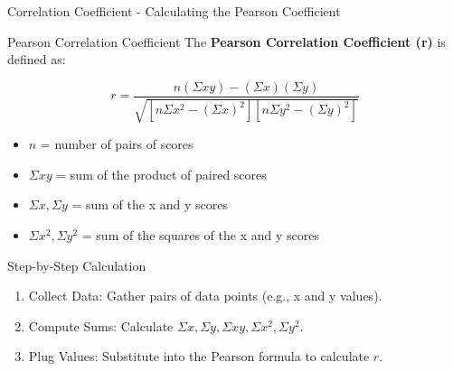 \documentclass[aspectratio=169]{beamer}
\begin{document}
\begin{frame}[fragile]{Correlation Coefficient - Calculating the Pearson Coefficient}
    \begin{block}{Pearson Correlation Coefficient}
        The \textbf{Pearson Correlation Coefficient (r)} is defined as:
    \end{block}
    
    \begin{equation}
        r = \frac{n(\Sigma xy) - (\Sigma x)(\Sigma y)}{\sqrt{[n\Sigma x^2 - (\Sigma x)^2][n\Sigma y^2 - (\Sigma y)^2]}}
    \end{equation}

    \begin{itemize}
        \item \( n \) = number of pairs of scores
        \item \( \Sigma xy \) = sum of the product of paired scores
        \item \( \Sigma x, \Sigma y \) = sum of the x and y scores
        \item \( \Sigma x^2, \Sigma y^2 \) = sum of the squares of the x and y scores
    \end{itemize}
    
    \begin{block}{Step-by-Step Calculation}
        \begin{enumerate}
            \item Collect Data: Gather pairs of data points (e.g., x and y values).
            \item Compute Sums: Calculate \( \Sigma x, \Sigma y, \Sigma xy, \Sigma x^2, \Sigma y^2 \).
            \item Plug Values: Substitute into the Pearson formula to calculate \( r \).
        \end{enumerate}
    \end{block}
\end{frame}
\end{document}

